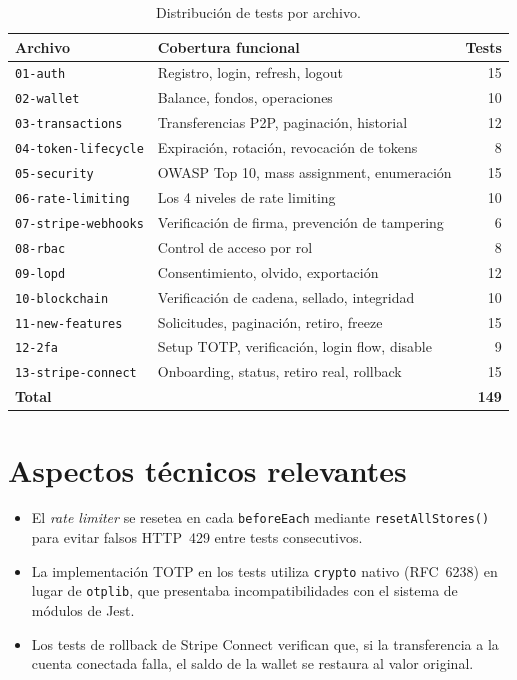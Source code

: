 \begin{table}[H]
\centering
\caption{Distribución de tests por archivo.}\label{tab:tests}
\begin{tabularx}{\textwidth}{lXr}
\toprule
\textbf{Archivo} & \textbf{Cobertura funcional} & \textbf{Tests} \\
\midrule
\texttt{01-auth}           & Registro, login, refresh, logout                & 15 \\
\texttt{02-wallet}         & Balance, fondos, operaciones                    & 10 \\
\texttt{03-transactions}   & Transferencias P2P, paginación, historial        & 12 \\
\texttt{04-token-lifecycle} & Expiración, rotación, revocación de tokens      & 8  \\
\texttt{05-security}       & OWASP Top 10, mass assignment, enumeración       & 15 \\
\texttt{06-rate-limiting}  & Los 4 niveles de rate limiting                   & 10 \\
\texttt{07-stripe-webhooks} & Verificación de firma, prevención de tampering  & 6  \\
\texttt{08-rbac}           & Control de acceso por rol                        & 8  \\
\texttt{09-lopd}           & Consentimiento, olvido, exportación              & 12 \\
\texttt{10-blockchain}     & Verificación de cadena, sellado, integridad      & 10 \\
\texttt{11-new-features}   & Solicitudes, paginación, retiro, freeze          & 15 \\
\texttt{12-2fa}            & Setup TOTP, verificación, login flow, disable    & 9  \\
\texttt{13-stripe-connect} & Onboarding, status, retiro real, rollback         & 15 \\
\midrule
\textbf{Total}             &                                                  & \textbf{149} \\
\bottomrule
\end{tabularx}
\end{table}

\section{Aspectos técnicos relevantes}

\begin{itemize}
  \item El \emph{rate limiter} se resetea en cada \texttt{beforeEach} mediante \texttt{resetAllStores()} para evitar falsos HTTP~429 entre tests consecutivos.
  \item La implementación TOTP en los tests utiliza \texttt{crypto} nativo (RFC~6238) en lugar de \texttt{otplib}, que presentaba incompatibilidades con el sistema de módulos de Jest.
  \item Los tests de rollback de Stripe Connect verifican que, si la transferencia a la cuenta conectada falla, el saldo de la wallet se restaura al valor original.
\end{itemize}

